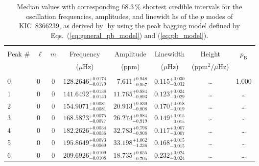 \begin{table*}[!]
\caption{Median values with corresponding 68.3\,\% shortest credible intervals for the oscillation frequencies, amplitudes, and linewidt hs of the $p$ modes of KIC~8366239, as derived by \diamonds\,\,by using the peak bagging model defined by Eqs.~(\ref{eq:general_pb_model}) and (\ref{eq:pb_model}).}
\label{tab:8366239p}
\centering
\begin{tabular}{llcrrlrc}
\hline\hline
\\[-8pt]          
Peak \# & $\ell$ & $m$ & \multicolumn{1}{c}{Frequency} & \multicolumn{1}{c}{Amplitude} & \multicolumn{1}{c}{Linewidth} & \multicolumn{1}{c}{Height}& $p_\mathrm{B}$\\
 & & & \multicolumn{1}{c}{($\mu$Hz)} & \multicolumn{1}{c}{(ppm)} & \multicolumn{1}{c}{($\mu$Hz)} & \multicolumn{1}{c}{(ppm$^2/\mu$Hz)}\\
\hline \\[-8pt]
0 & 0 & 0 & $    128.2646_{-      0.0179}^{+      0.0174}$ & $       7.611_{-       0.957}^{+       0.948}$ & $       0.115_{-       0.032}^{+       0.030}$ & \multicolumn{1}{c}{\dots} & 1.000\\[1pt]
1 & 0 & 0 & $    141.6492_{-      0.0140}^{+      0.0138}$ & $      11.765_{-       0.893}^{+       0.884}$ & $       0.123_{-       0.029}^{+       0.024}$ & \multicolumn{1}{c}{\dots} & \dots \\[1pt]
2 & 0 & 0 & $    154.9071_{-      0.0081}^{+      0.0081}$ & $      20.913_{-       0.808}^{+       0.830}$ & $       0.170_{-       0.019}^{+       0.018}$ & \multicolumn{1}{c}{\dots} & \dots \\[1pt]
3 & 0 & 0 & $    168.5823_{-      0.0077}^{+      0.0075}$ & $      26.274_{-       0.919}^{+       0.984}$ & $       0.149_{-       0.015}^{+       0.015}$ & \multicolumn{1}{c}{\dots} & \dots \\[1pt]
4 & 0 & 0 & $    182.2626_{-      0.0036}^{+      0.0034}$ & $      32.783_{-       0.908}^{+       0.796}$ & $       0.117_{-       0.007}^{+       0.007}$ & \multicolumn{1}{c}{\dots} & \dots \\[1pt]
5 & 0 & 0 & $    195.8649_{-      0.0069}^{+      0.0073}$ & $      33.198_{-       1.236}^{+       1.062}$ & $       0.168_{-       0.015}^{+       0.015}$ & \multicolumn{1}{c}{\dots} & \dots \\[1pt]
6 & 0 & 0 & $    209.6926_{-      0.0108}^{+      0.0109}$ & $      18.735_{-       0.705}^{+       0.655}$ & $       0.232_{-       0.024}^{+       0.024}$ & \multicolumn{1}{c}{\dots} & \dots \\[1pt]

\end{tabular}
\end{table*}
